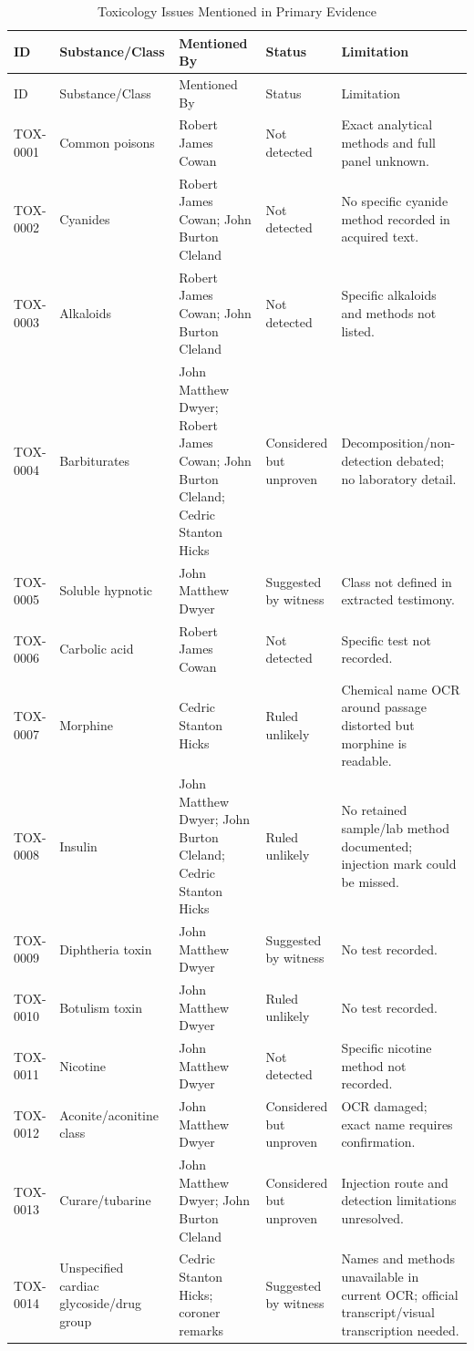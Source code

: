 \begin{longtable}{p{}p{}p{}p{}p{}}
\caption{Toxicology Issues Mentioned in Primary Evidence}\label{tab:toxicology}\\
\toprule
ID & Substance/Class & Mentioned By & Status & Limitation \\
\midrule
\endfirsthead
\toprule
ID & Substance/Class & Mentioned By & Status & Limitation \\
\midrule
\endhead
TOX-0001 & Common poisons & Robert James Cowan & Not detected & Exact analytical methods and full panel unknown. \\
TOX-0002 & Cyanides & Robert James Cowan; John Burton Cleland & Not detected & No specific cyanide method recorded in acquired text. \\
TOX-0003 & Alkaloids & Robert James Cowan; John Burton Cleland & Not detected & Specific alkaloids and methods not listed. \\
TOX-0004 & Barbiturates & John Matthew Dwyer; Robert James Cowan; John Burton Cleland; Cedric Stanton Hicks & Considered but unproven & Decomposition/non-detection debated; no laboratory detail. \\
TOX-0005 & Soluble hypnotic & John Matthew Dwyer & Suggested by witness & Class not defined in extracted testimony. \\
TOX-0006 & Carbolic acid & Robert James Cowan & Not detected & Specific test not recorded. \\
TOX-0007 & Morphine & Cedric Stanton Hicks & Ruled unlikely & Chemical name OCR around passage distorted but morphine is readable. \\
TOX-0008 & Insulin & John Matthew Dwyer; John Burton Cleland; Cedric Stanton Hicks & Ruled unlikely & No retained sample/lab method documented; injection mark could be missed. \\
TOX-0009 & Diphtheria toxin & John Matthew Dwyer & Suggested by witness & No test recorded. \\
TOX-0010 & Botulism toxin & John Matthew Dwyer & Ruled unlikely & No test recorded. \\
TOX-0011 & Nicotine & John Matthew Dwyer & Not detected & Specific nicotine method not recorded. \\
TOX-0012 & Aconite/aconitine class & John Matthew Dwyer & Considered but unproven & OCR damaged; exact name requires confirmation. \\
TOX-0013 & Curare/tubarine & John Matthew Dwyer; John Burton Cleland & Considered but unproven & Injection route and detection limitations unresolved. \\
TOX-0014 & Unspecified cardiac glycoside/drug group & Cedric Stanton Hicks; coroner remarks & Suggested by witness & Names and methods unavailable in current OCR; official transcript/visual transcription needed. \\
\bottomrule
\end{longtable}
